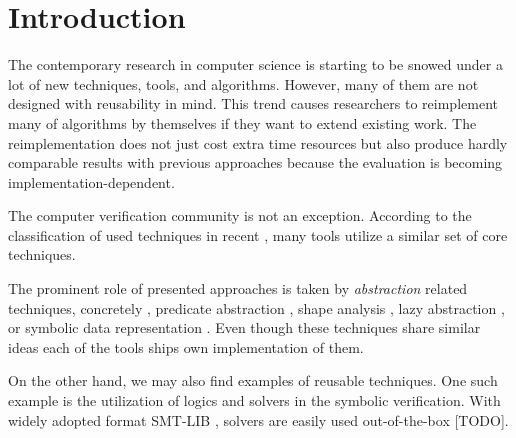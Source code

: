\chapter{Introduction}
\label{ch:intro}


The contemporary research in computer science is starting to be snowed under a lot of new techniques, tools, and algorithms.
However, many of them are not designed with reusability in mind.
This trend causes researchers to reimplement many of algorithms by themselves if they want to extend existing work.
The reimplementation does not just cost extra time resources but also produce hardly comparable results with previous approaches because the evaluation is becoming implementation-dependent.

The computer verification community is not an exception.
According to the classification of used techniques in recent \svcomp \cite{SVCOMP2019}, many tools utilize a similar set of core techniques.

The prominent role of presented approaches is taken by \emph{abstraction} related techniques, concretely \cegar
\cite{Clarke20}, predicate abstraction \cite{Flanagan02}, shape analysis \cite{Yang2008}, lazy abstraction \cite{Henzinger2002}, or symbolic data representation \cite{King76,Burch1990}.
Even though these techniques share similar ideas each of the tools ships own implementation of them.


On the other hand, we may also find examples of reusable techniques.
One such example is the utilization of \smt logics and solvers in the symbolic verification.
With widely adopted format SMT-LIB \cite{Barrett2010}, \smt solvers are easily used out-of-the-box [TODO].


